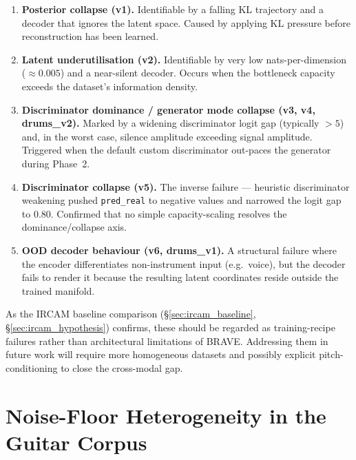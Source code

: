 \documentclass[a4paper,11pt,oneside,openany]{book}
\begin{document}
\begin{enumerate}
\item \textbf{Posterior collapse (v1).} Identifiable by a falling KL trajectory and a decoder that ignores the latent space. Caused by applying KL pressure before reconstruction has been learned.
\item \textbf{Latent underutilisation (v2).} Identifiable by very low nats-per-dimension ($\approx 0.005$) and a near-silent decoder. Occurs when the bottleneck capacity exceeds the dataset's information density.
\item \textbf{Discriminator dominance / generator mode collapse (v3, v4, drums\_v2).} Marked by a widening discriminator logit gap (typically $>5$) and, in the worst case, silence amplitude exceeding signal amplitude. Triggered when the default custom discriminator out-paces the generator during Phase~2.
\item \textbf{Discriminator collapse (v5).} The inverse failure --- heuristic discriminator weakening pushed \texttt{pred\_real} to negative values and narrowed the logit gap to 0.80. Confirmed that no simple capacity-scaling resolves the dominance/collapse axis.
\item \textbf{OOD decoder behaviour (v6, drums\_v1).} A structural failure where the encoder differentiates non-instrument input (e.g.\ voice), but the decoder fails to render it because the resulting latent coordinates reside outside the trained manifold.
\end{enumerate}

As the IRCAM baseline comparison (\S\ref{sec:ircam_baseline}, \S\ref{sec:ircam_hypothesis}) confirms, these should be regarded as training-recipe failures rather than architectural limitations of BRAVE. Addressing them in future work will require more homogeneous datasets and possibly explicit pitch-conditioning to close the cross-modal gap.

\section{Noise-Floor Heterogeneity in the Guitar Corpus}\label{sec:noise_floor}
\end{document}
